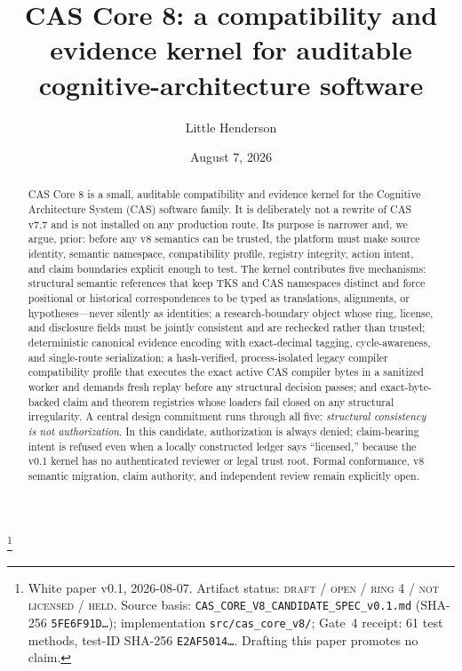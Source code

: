\documentclass[11pt]{amsart}
\theoremstyle{definition}
\theoremstyle{remark}
\begin{document}
\title[CAS Core 8: a compatibility and evidence kernel]{CAS Core 8: a compatibility and evidence kernel for auditable cognitive-architecture software}
\author{Little Henderson}
\thanks{White paper v0.1, 2026-08-07. Artifact status: \textsc{draft / open / ring 4 / not licensed / held}. Source basis: \texttt{CAS\_CORE\_V8\_CANDIDATE\_SPEC\_v0.1.md} (SHA-256 \texttt{5FE6F91D\ldots}); implementation \texttt{src/cas\_core\_v8/}; Gate~4 receipt: 61 test methods, test-ID SHA-256 \texttt{E2AF5014\ldots}. Drafting this paper promotes no claim.}
\date{August 7, 2026}

\begin{abstract}
CAS Core 8 is a small, auditable compatibility and evidence kernel for the Cognitive Architecture System (CAS) software family. It is deliberately not a rewrite of CAS v7.7 and is not installed on any production route. Its purpose is narrower and, we argue, prior: before any v8 semantics can be trusted, the platform must make source identity, semantic namespace, compatibility profile, registry integrity, action intent, and claim boundaries explicit enough to test. The kernel contributes five mechanisms: structural semantic references that keep TKS and CAS namespaces distinct and force positional or historical correspondences to be typed as translations, alignments, or hypotheses---never silently as identities; a research-boundary object whose ring, license, and disclosure fields must be jointly consistent and are rechecked rather than trusted; deterministic canonical evidence encoding with exact-decimal tagging, cycle-awareness, and single-route serialization; a hash-verified, process-isolated legacy compiler compatibility profile that executes the exact active CAS compiler bytes in a sanitized worker and demands fresh replay before any structural decision passes; and exact-byte-backed claim and theorem registries whose loaders fail closed on any structural irregularity. A central design commitment runs through all five: \emph{structural consistency is not authorization}. In this candidate, authorization is always denied; claim-bearing intent is refused even when a locally constructed ledger says ``licensed,'' because the v0.1 kernel has no authenticated reviewer or legal trust root. Formal conformance, v8 semantic migration, claim authority, and independent review remain explicitly open.
\end{abstract}

\maketitle
\end{document}
